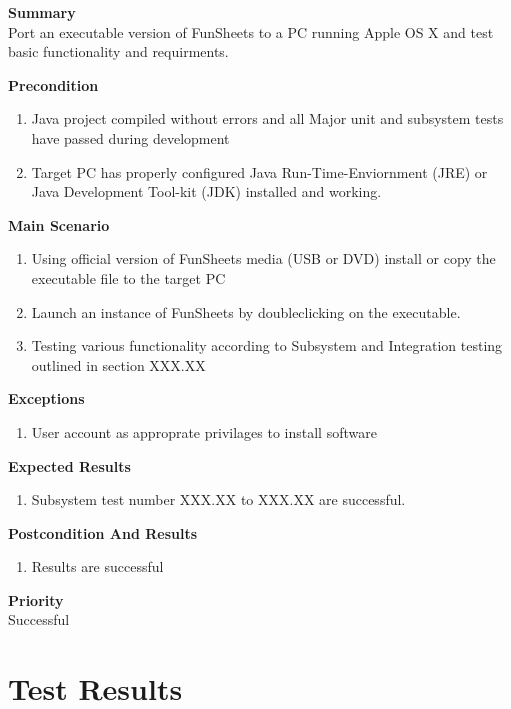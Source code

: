 \documentclass[12pt]{article}
\begin{document}
\noindent
{\bf Summary}\\
Port an executable version of FunSheets to a PC running Apple OS X and test basic functionality and requirments.

\noindent
{\bf Precondition}\\
\begin{enumerate}
\item Java project compiled without errors and all Major unit and subsystem tests have passed during development
\item Target PC has properly configured Java Run-Time-Enviornment (JRE) or Java Development Tool-kit (JDK) installed and working.
\end{enumerate}

\noindent
{\bf Main Scenario}\
\vspace*{-0.2in}
\begin{enumerate}
\item Using official version of FunSheets media (USB or DVD) install or copy the executable file to the target PC
\item Launch an instance of FunSheets by doubleclicking on the executable.
\item Testing various functionality according to Subsystem and Integration testing outlined in section XXX.XX
\end{enumerate}

{\bf Exceptions}\
\begin{enumerate}
\item User account as approprate privilages to install software
\end{enumerate}

{\bf Expected Results}\
\begin{enumerate}
\item Subsystem test number XXX.XX to XXX.XX are successful.
\end{enumerate}

{\bf Postcondition And Results}\
\begin{enumerate}
\item Results are successful
\end{enumerate}

\noindent
{\bf Priority}\\
Successful
\noindent

\section{Test Results}
\end{document}
